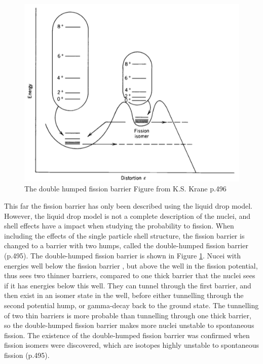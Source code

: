 \documentclass[]{article}
\begin{document}
  \begin{figure} [H]
	\centering
	\includegraphics[scale=0.7]{double_humped_fission_barrier.png}
	\caption{The double humped fission barrier Figure from K.S. Krane p.496 \cite{Krane1988}}
	\label{fig:double_humped_fission_barrier}
\end{figure}

\par
\vspace{3mm}

\noindent This far  the fission barrier has only been described using the liquid drop model. However, the liquid drop model is not a complete description of the nuclei, and shell effects have a impact when studying the probability to fission. When including the effects of the single particle shell structure, the fission barrier is changed to a barrier with two humps, called the double-humped fission barrier \cite{Krane1988} (p.495). The double-humped fission barrier is shown in Figure \ref{fig:double_humped_fission_barrier}. Nucei with energies well below the fission barrier , but above the well in the fission potential, thus sees two thinner barriers, compared to one thick barrier that the nuclei sees if it has energies below this well. They can tunnel through the first barrier, and then exist in an isomer state in the well, before either tunnelling through the second potential hump, or gamma-decay back to the ground state.  The tunnelling of two thin barriers is more probable than tunnelling through one thick barrier, so the double-humped fission barrier makes more nuclei unstable to spontaneous fission. The existence of the double-humped fission barrier was confirmed when fission isomers were discovered, which are isotopes highly unstable to spontaneous fission \cite{Krane1988} (p.495). 
\end{document}
